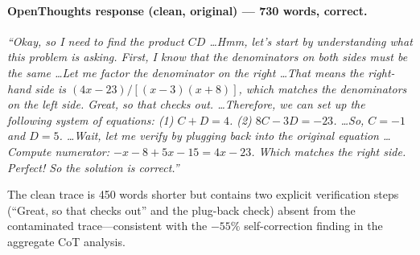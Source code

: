 \documentclass{article} %
\begin{document}
\paragraph{OpenThoughts response (clean, original) --- 730 words, correct.}
\begin{mdframed}
\textit{``Okay, so I need to find the product $CD$ \ldots Hmm, let's start by understanding what this problem is asking. First, I know that the denominators on both sides must be the same \ldots Let me factor the denominator on the right \ldots That means the right-hand side is $(4x{-}23)/[(x{-}3)(x{+}8)]$, which matches the denominators on the left side. Great, so that checks out. \ldots Therefore, we can set up the following system of equations: (1) $C + D = 4$. (2) $8C - 3D = -23$. \ldots So, $C = -1$ and $D = 5$. \ldots Wait, let me verify by plugging back into the original equation \ldots Compute numerator: $-x - 8 + 5x - 15 = 4x - 23$. Which matches the right side. Perfect! So the solution is correct.''}
\end{mdframed}
The clean trace is 450 words shorter but contains two explicit verification steps (``Great, so that checks out'' and the plug-back check) absent from the contaminated trace---consistent with the $-55\%$ self-correction finding in the aggregate CoT analysis.
\end{document}
